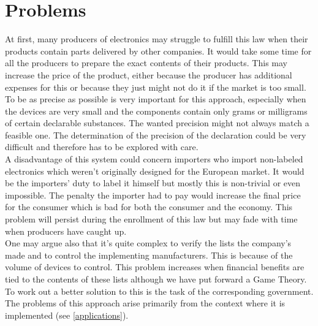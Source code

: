\section{Problems}
At first, many producers of electronics may struggle to fulfill this law when their products contain parts delivered by other companies. It would take some time for all the producers to prepare the exact contents of their products. This may increase the price of the product, either because the producer has additional expenses for this or because they just might not do it if the market is too small.\\
To be as precise as possible is very important for this approach, especially when the devices are very small and the components contain only grams or milligrams of certain declarable substances. The wanted precision might not always match a feasible one. The determination of the precision of the declaration could be very difficult and therefore has to be explored with care.\\
A disadvantage of this system could concern importers who import non-labeled electronics which weren't originally designed for the European market. It would be the importers' duty to label it himself but mostly this is non-trivial or even impossible. The penalty the importer had to pay would increase the final price for the consumer which is bad for both the consumer and the economy. This problem will persist during the enrollment of this law but may fade with time when producers have caught up.\\
One may argue also that it's quite complex to verify the lists the company’s made and to control the implementing manufacturers. This is because of the volume of devices to control. This problem increases when financial benefits are tied to the contents of these lists although we have put forward a Game Theory. To work out a better solution to this is the task of the corresponding government.
The problems of this approach arise primarily from the context where it is implemented (see \ref{applications}).